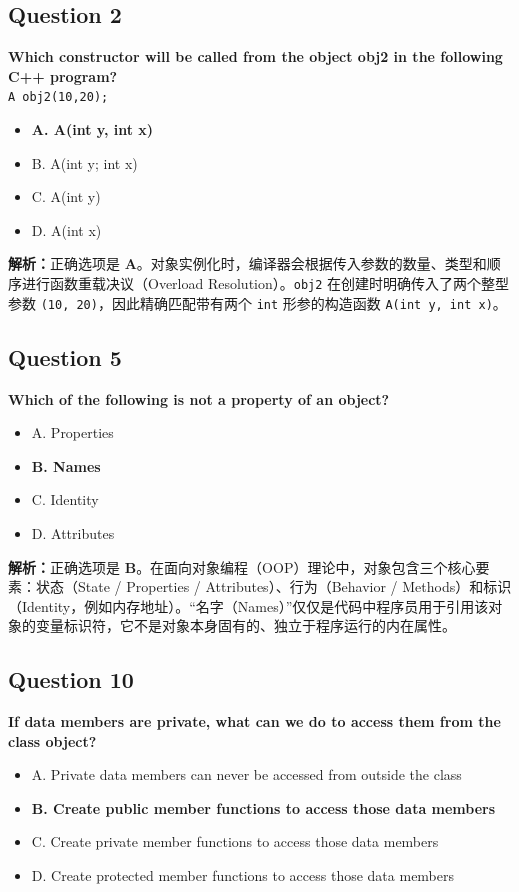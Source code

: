 \documentclass[11pt, a4paper]{article}
\begin{document}

\subsection*{Question 2}
\textbf{Which constructor will be called from the object obj2 in the following C++ program?}\\
\texttt{A obj2(10,20);}
\begin{itemize}
    \item \textbf{A. A(int y, int x)}
    \item B. A(int y; int x)
    \item C. A(int y)
    \item D. A(int x)
\end{itemize}

\textbf{解析：}正确选项是 \textbf{A}。对象实例化时，编译器会根据传入参数的数量、类型和顺序进行函数重载决议（Overload Resolution）。\texttt{obj2} 在创建时明确传入了两个整型参数 \texttt{(10, 20)}，因此精确匹配带有两个 \texttt{int} 形参的构造函数 \texttt{A(int y, int x)}。


\subsection*{Question 5}
\textbf{Which of the following is not a property of an object?}
\begin{itemize}
    \item A. Properties
    \item \textbf{B. Names}
    \item C. Identity
    \item D. Attributes
\end{itemize}

\textbf{解析：}正确选项是 \textbf{B}。在面向对象编程（OOP）理论中，对象包含三个核心要素：状态（State / Properties / Attributes）、行为（Behavior / Methods）和标识（Identity，例如内存地址）。“名字（Names）”仅仅是代码中程序员用于引用该对象的变量标识符，它不是对象本身固有的、独立于程序运行的内在属性。


\subsection*{Question 10}
\textbf{If data members are private, what can we do to access them from the class object?}
\begin{itemize}
    \item A. Private data members can never be accessed from outside the class
    \item \textbf{B. Create public member functions to access those data members}
    \item C. Create private member functions to access those data members
    \item D. Create protected member functions to access those data members
\end{itemize}
\end{document}
